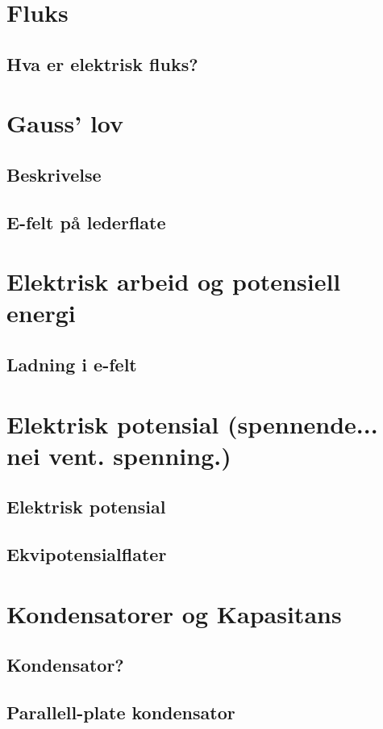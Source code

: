 \documentclass{article}
\begin{document}
  \section{Fluks}
    \subsection{Hva er elektrisk fluks?}
      
  \section{Gauss' lov}
    \subsection{Beskrivelse}
      
    \subsection{E-felt på lederflate}
      
  \section{Elektrisk arbeid og potensiell energi}
    \subsection{Ladning i e-felt}
      
  \section{Elektrisk potensial (spennende... nei vent. spenning.)}
    \subsection{Elektrisk potensial}
      
    \subsection{Ekvipotensialflater}
      
  \section{Kondensatorer og Kapasitans}
    \subsection{Kondensator?}
      
    \subsection{Parallell-plate kondensator}
      
\end{document}
